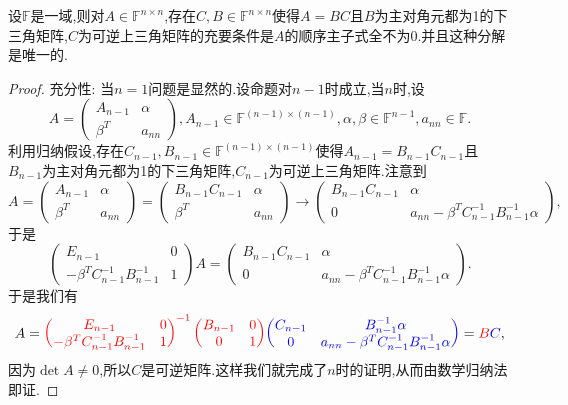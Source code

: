 \documentclass[../../main.tex]{subfiles}%
\begin{document}
\begin{theorem}[LU分解]\label{theorem:LU分解}
设\(\mathbb{F}\)是一域,则对\(A \in \mathbb{F}^{n \times n}\),存在\(C,B \in \mathbb{F}^{n \times n}\)使得\(A = BC\)且\(B\)为主对角元都为1的下三角矩阵,\(C\)为可逆上三角矩阵的充要条件是\(A\)的顺序主子式全不为0.并且这种分解是唯一的.
\end{theorem}
\begin{proof}

{\heiti 充分性:} 当\(n = 1\)问题是显然的.设命题对\(n - 1\)时成立,当\(n\)时,设
\[
A = \begin{pmatrix}
A_{n - 1} & \alpha \\
\beta^T & a_{nn}
\end{pmatrix}, A_{n - 1} \in \mathbb{F}^{(n - 1) \times (n - 1)}, \alpha, \beta \in \mathbb{F}^{n - 1}, a_{nn} \in \mathbb{F}.
\]
利用归纳假设,存在\(C_{n - 1}, B_{n - 1} \in \mathbb{F}^{(n - 1) \times (n - 1)}\)使得\(A_{n - 1} = B_{n - 1}C_{n - 1}\)且\(B_{n - 1}\)为主对角元都为1的下三角矩阵,\(C_{n - 1}\)为可逆上三角矩阵.注意到
\[
A = \begin{pmatrix}
A_{n - 1} & \alpha \\
\beta^T & a_{nn}
\end{pmatrix} = \begin{pmatrix}
B_{n - 1}C_{n - 1} & \alpha \\
\beta^T & a_{nn}
\end{pmatrix} \to \begin{pmatrix}
B_{n - 1}C_{n - 1} & \alpha \\
0 & a_{nn} - \beta^T C_{n - 1}^{-1} B_{n - 1}^{-1} \alpha
\end{pmatrix},
\]
于是
\[
\begin{pmatrix}
E_{n - 1} & 0 \\
-\beta^T C_{n - 1}^{-1} B_{n - 1}^{-1} & 1
\end{pmatrix} A = \begin{pmatrix}
B_{n - 1}C_{n - 1} & \alpha \\
0 & a_{nn} - \beta^T C_{n - 1}^{-1} B_{n - 1}^{-1} \alpha
\end{pmatrix}.
\]
于是我们有
\[
A = {\color{red} \begin{pmatrix}
E_{n - 1} & 0 \\
-\beta^T C_{n - 1}^{-1} B_{n - 1}^{-1} & 1
\end{pmatrix}^{-1} \begin{pmatrix}
B_{n - 1} & 0 \\
0 & 1
\end{pmatrix}} {\color{blue} \begin{pmatrix}
C_{n - 1} & B_{n - 1}^{-1} \alpha \\
0 & a_{nn} - \beta^T C_{n - 1}^{-1} B_{n - 1}^{-1} \alpha
\end{pmatrix}} = {\color{red} B}{\color{blue} C},
\]
因为\(\det A \neq 0\),所以\(C\)是可逆矩阵.这样我们就完成了\(n\)时的证明,从而由数学归纳法即证.


\end{proof}
\end{document}
